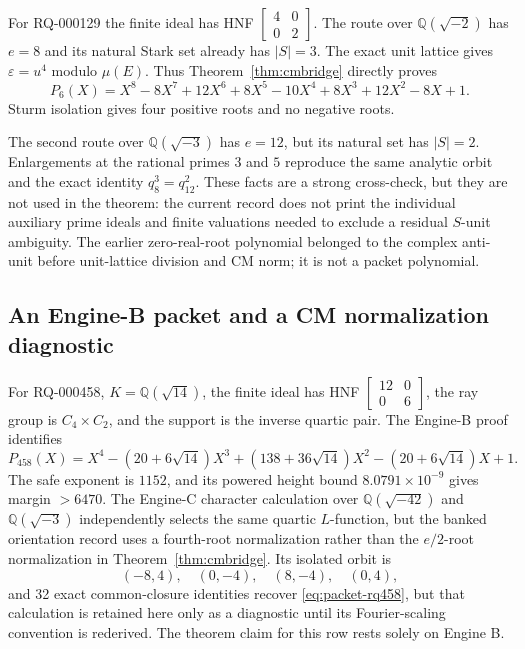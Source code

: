 \documentclass[11pt]{article}
\newcommand{\Q}{\mathbb Q}
\begin{document}
For RQ-000129 the finite ideal has HNF
\(\left[\begin{smallmatrix}4&0\\0&2\end{smallmatrix}\right]\).
The route over \(\Q(\sqrt{-2})\) has \(e=8\) and its natural Stark set
already has \(|S|=3\).  The exact unit lattice gives
\(\varepsilon=u^4\) modulo \(\mu(E)\).  Thus
Theorem~\ref{thm:cmbridge} directly proves
\begin{equation}\label{eq:packet-q6}
P_6(X)=X^8-8X^7+12X^6+8X^5-10X^4
       +8X^3+12X^2-8X+1.
\end{equation}
Sturm isolation gives four positive roots and no negative roots.

The second route over \(\Q(\sqrt{-3})\) has \(e=12\), but its natural
set has \(|S|=2\).  Enlargements at the rational primes \(3\) and
\(5\) reproduce the same analytic orbit and the exact identity
\(q_8^3=q_{12}^2\).  These facts are a strong cross-check, but they
are not used in the theorem: the current record does not print the
individual auxiliary prime ideals and finite valuations needed to
exclude a residual \(S\)-unit ambiguity.  The earlier
zero-real-root polynomial belonged to the complex anti-unit before
unit-lattice division and CM norm; it is not a packet polynomial.

\subsection{An Engine-B packet and a CM normalization diagnostic}
\label{sec:rq458}

For RQ-000458, \(K=\Q(\sqrt{14})\), the finite ideal has HNF
\(\left[\begin{smallmatrix}12&0\\0&6\end{smallmatrix}\right]\),
the ray group is \(C_4\times C_2\), and the support is the inverse
quartic pair.  The Engine-B proof identifies
\begin{equation}\label{eq:packet-rq458}
P_{458}(X)=X^4-(20+6\sqrt{14})X^3
 +(138+36\sqrt{14})X^2-(20+6\sqrt{14})X+1.
\end{equation}
The safe exponent is \(1152\), and its powered height bound
\(8.0791\times10^{-9}\) gives margin \(>6470\).  The Engine-C
character calculation over \(\Q(\sqrt{-42})\) and
\(\Q(\sqrt{-3})\) independently selects the same quartic
\(L\)-function, but the banked orientation record uses a fourth-root
normalization rather than the \(e/2\)-root normalization in
Theorem~\ref{thm:cmbridge}.  Its isolated orbit is
\[
(-8,4),\quad(0,-4),\quad(8,-4),\quad(0,4),
\]
and 32 exact common-closure identities recover
\eqref{eq:packet-rq458}, but that
calculation is retained here only as a diagnostic until its
Fourier-scaling convention is rederived.  The theorem claim for this
row rests solely on Engine B.
\end{document}
